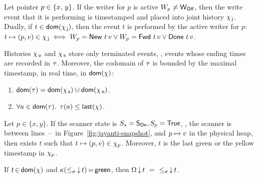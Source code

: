 
\begin{invariant}\label{inv:joint-hist}%
Let pointer $p \in \{x,\, y\}$. If the writer for $p$ is active \ie
$W_p \neq \mathsf{W_{Off}}$, then the write event that it is performing is
timestamped and placed into joint history $\chi_{\, \mathsf{j}}$. Dually, if $t \in
\mathsf{dom}(\chi_{\, \mathsf{j}})$, then the event $t$ is performed by the active writer
for $p$: $t \hpts (p,v) \in \histJ \iff \wpp = \wWrite\ t\, v \vee
\wpp = \wDirty\ t\, v \vee \wClean\ t\, v$.
\end{invariant}


\begin{invariant}\label{inv:dom-tau}%
Histories $\chi_{\, \mathsf{o}}$ and $\chi_{\, \mathsf{s}}$ store only terminated events, \ie,
events whose ending times are recorded in $\tau$. Moreover, the codomain
of $\tau$ is bounded by the maximal timestamp, in real time, in
$\mathsf{dom}(\chi)$:
\begin{enumerate}
\item $\dom{\E} = \dom{\histS} \hunion \dom{\histO}$.
\item $\forall a \in \mathsf{dom}(\tau)\mathord{.}\,\ \tau(a) \leq
  \mathsf{last}(\chi)$.
\end{enumerate}
\end{invariant}


\begin{lemma}\label{lemma:first-read}%
Let $p \in \{x, y\}$. If the scanner state is $S_s= \mathsf{S_{On}}, S_p =
\mathsf{True}$, \ie, the scanner is between
lines~\lineScanReadsX--\lineScanReadsY\ in
Figure~\ref{fig:jayanti-snapshot}, and $ p \mapsto v$ in the physical
heap, then exists $t$ such that $ t \mapsto (p, v) \in
\chi_p$. Moreover, $t$
is the last green or the yellow timestamp in $\chi_p$.
\end{lemma}

\begin{lemma}[Chain]\label{lemma:complete-green}%
If $t\,{\in}\,\mathsf{dom}(\chi)$ and $\kappa({\mathrel{\leq_\sigma}}\,{\downarrow}\,t)\,{=}\,\mathsf{green}$, 
then
$\ideal{\stableorder}{t}\ =\ \ideal{{\tleq}}{t}$.
\end{lemma}


